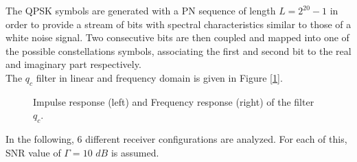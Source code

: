 \documentclass[a4paper, 12pt]{report}
\begin{document}
The QPSK symbols are generated with a PN sequence of length $L=2^{20}-1$ in order to provide a stream of bits with spectral characteristics similar to those of a white noise signal. Two consecutive bits are then coupled and mapped into one of the possible constellations symbols, associating the first and second bit to the real and imaginary part respectively. \\
The $q_c$ filter in linear and frequency domain is given in Figure [\ref{qc}].

\begin{figure}[H]
	\centering
	\caption{Impulse response (left) and Frequency response (right) of the filter $q_c$.}\label{qc}
\end{figure}

In the following, 6 different receiver configurations are analyzed. For each of this, SNR value of $\Gamma = 10$ $dB$ is assumed.

\clearpage
\end{document}
